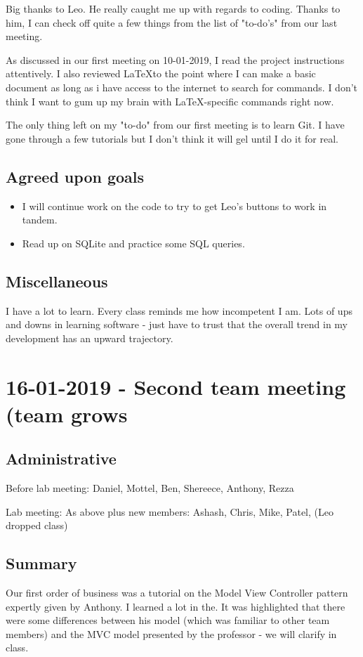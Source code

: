 \documentclass[12pt]{article}
\begin{document}
Big thanks to Leo. He really caught me up with regards to coding. Thanks to him, I can check off quite a few things from the list of "to-do's" from our last meeting.

As discussed in our first meeting on 10-01-2019, I read the project instructions attentively. I also reviewed \LaTeX to the point where I can make a basic document as long as i have access to the internet to search for commands. I don't think I want to gum up my brain with \LaTeX -specific commands right now.

The only thing left on my "to-do" from our first meeting is to learn Git. I have gone through a few tutorials but I don't think it will gel until I do it for real.

\subsection{Agreed upon goals}
\begin{itemize}
\item I will continue work on the code to try to get Leo's buttons to work in tandem.
\item Read up on SQLite and practice some SQL queries.
\end{itemize}

\subsection{Miscellaneous}
I have a lot to learn. Every class reminds me how incompetent I am. Lots of ups and downs in learning software - just have to trust that the overall trend in my development has an upward trajectory.

\pagebreak

\section{16-01-2019 - Second team meeting (team grows}

\subsection{Administrative}
Before lab meeting: Daniel, Mottel, Ben, Shereece, Anthony, Rezza

Lab meeting: As above plus new members: Ashash, Chris, Mike, Patel, (Leo dropped class)

\subsection{Summary}
Our first order of business was a tutorial on the Model View Controller pattern expertly given by Anthony. I learned a lot in the. It was highlighted that there were some differences between his model (which was familiar to other team members) and the MVC model presented by the professor - we will clarify in class.
\end{document}

